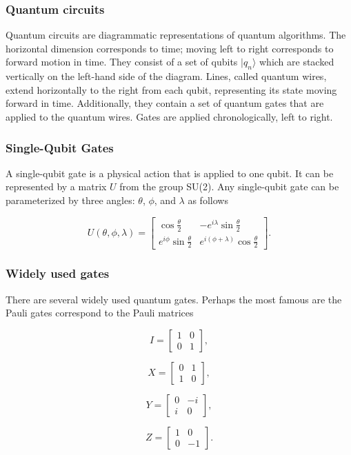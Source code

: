 \documentclass{beamer}
\begin{document}
\begin{frame}
\frametitle{Quantum circuits}

Quantum circuits are diagrammatic representations of quantum
algorithms. The horizontal dimension corresponds to time; moving left
to right corresponds to forward motion in time. They consist of a set
of qubits $\vert q_n\rangle$ which are stacked vertically on the left-hand
side of the diagram. Lines, called quantum wires, extend horizontally
to the right from each qubit, representing its state moving forward in
time. Additionally, they contain a set of quantum gates that are
applied to the quantum wires. Gates are applied chronologically, left
to right.
\end{frame}

\begin{frame}
\frametitle{Single-Qubit Gates}

A single-qubit gate is a physical action that is applied to one
qubit. It can be represented by a matrix $U$ from the group SU(2). Any
single-qubit gate can be parameterized by three angles: $\theta$,
$\phi$, and $\lambda$ as follows

\[
U(\theta,\phi,\lambda)=\begin{bmatrix}
\cos\frac{\theta}{2} & -e^{i\lambda}\sin\frac{\theta}{2}
\\
e^{i\phi}\sin\frac{\theta}{2} & e^{i(\phi+\lambda)}\cos\frac{\theta}{2}
\end{bmatrix}.
\]
\end{frame}

\begin{frame}
\frametitle{Widely used gates}

There are several widely used quantum gates. Perhaps the most famous are 
the Pauli gates correspond to the Pauli matrices

\[
I=\begin{bmatrix} 1 & 0 \\ 0 & 1 \end{bmatrix},
\]

\[
X =\begin{bmatrix} 0 & 1 \\ 1 & 0\end{bmatrix},
\]

\[
Y=\begin{bmatrix}0 & -i \\i & 0\end{bmatrix},
\]

\[
Z=\begin{bmatrix} 1 & 0 \\ 0 & -1\end{bmatrix}.
\]
\end{frame}
\end{document}
